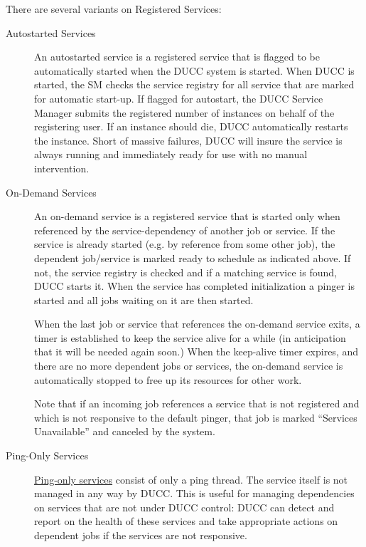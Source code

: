       There are several variants on Registered Services:
      \begin{description}

        \item[Autostarted Services] An autostarted service is a registered service that is flagged to be
          automatically started when the DUCC system is started. When DUCC is started, the SM checks the
          service registry for all service that are marked for automatic start-up.  If flagged for autostart,
          the DUCC Service Manager submits the registered number of instances
          on behalf of the registering user.  If an instance should die, DUCC automatically restarts
          the instance.  Short of massive failures, DUCC will insure the service is always running
          and immediately ready for use with no manual intervention.
          
        \item[On-Demand Services] An on-demand service is a registered service that is started only
          when referenced by the service-dependency of another job or service. If the service is
          already started (e.g. by reference from some other job), the dependent job/service is
          marked ready to schedule as indicated above. If not, the service registry is checked and
          if a matching service is found, DUCC starts it. When the service has completed
          initialization a pinger is started and all jobs waiting on it are then started.
          
          When the last job or service that references the on-demand service exits, a timer is
          established to keep the service alive for a while (in anticipation that it will be needed
          again soon.)  When the keep-alive timer expires, and there are no more dependent
          jobs or services, the on-demand service is automatically stopped to free up its resources for
          other work.

          Note that if an incoming job references a service that is not registered and which is not
          responsive to the default pinger, that job is marked ``Services Unavailable'' and canceled
          by the system.

        \item[Ping-Only Services] 
          \label{subsub:services.ping-only}
          \hyperref[sec:services.implicit]{Ping-only services} consist of only
          a ping thread.  The service itself is not managed in any way by DUCC.  This is useful for
          managing dependencies on services that are not under DUCC control: DUCC can detect and
          report on the health of these services and take appropriate actions on dependent jobs if
          the services are not responsive.
      \end{description}
          
